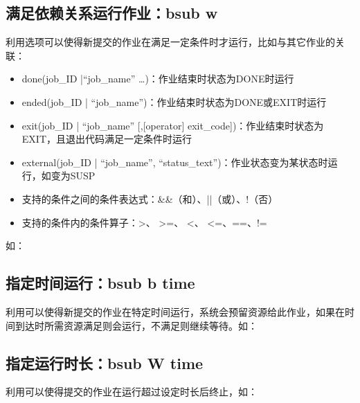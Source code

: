\documentclass[a4paper,12pt,english]{sphinxmanual}
\begin{document}
\subsection{满足依赖关系运行作业：bsub \sphinxhyphen{}w}
\label{\detokenize{lsf/lsf:bsub-w}}
\sphinxAtStartPar
利用选项可以使得新提交的作业在满足一定条件时才运行，比如与其它作业的关联：
\begin{itemize}
\item {} 
\sphinxAtStartPar
done(job\_ID |“job\_name” …)：作业结束时状态为DONE时运行

\item {} 
\sphinxAtStartPar
ended(job\_ID | “job\_name”)：作业结束时状态为DONE或EXIT时运行

\item {} 
\sphinxAtStartPar
exit(job\_ID | “job\_name” {[},{[}operator{]}
exit\_code{]})：作业结束时状态为EXIT，且退出代码满足一定条件时运行

\item {} 
\sphinxAtStartPar
external(job\_ID | “job\_name”,
“status\_text”)：作业状态变为某状态时运行，如变为SUSP

\item {} 
\sphinxAtStartPar
支持的条件之间的条件表达式：\&\&（和）、||（或）、!（否）

\item {} 
\sphinxAtStartPar
支持的条件内的条件算子：>、 >=、 <、 <=、==、!=

\end{itemize}

\sphinxAtStartPar
如：


\subsection{指定时间运行：bsub \sphinxhyphen{}b time}
\label{\detokenize{lsf/lsf:bsub-b-time}}
\sphinxAtStartPar
利用可以使得新提交的作业在特定时间运行，系统会预留资源给此作业，如果在时间到达时所需资源满足则会运行，不满足则继续等待。如：

\sphinxAtStartPar
{}


\subsection{指定运行时长：bsub \sphinxhyphen{}W time}
\label{\detokenize{lsf/lsf:bsub-w-time}}
\sphinxAtStartPar
利用可以使得提交的作业在运行超过设定时长后终止，如：
\end{document}
